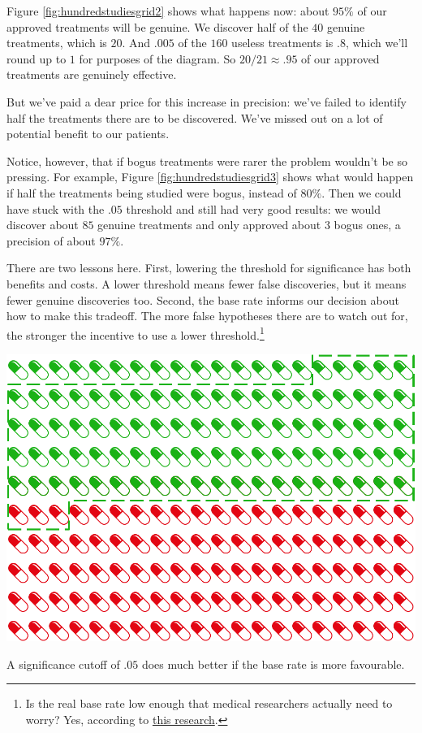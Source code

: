 \documentclass[justified]{tufte-book}
\theoremstyle{definition}
\theoremstyle{definition}
\theoremstyle{definition}
\theoremstyle{remark}
\begin{document}
Figure \ref{fig:hundredstudiesgrid2} shows what happens now: about \(95\%\) of our approved treatments will be genuine. We discover half of the \(40\) genuine treatments, which is \(20\). And \(.005\) of the \(160\) useless treatments is \(.8\), which we'll round up to \(1\) for purposes of the diagram. So \(20/21 \approx .95\) of our approved treatments are genuinely effective.

But we've paid a dear price for this increase in precision: we've failed to identify half the treatments there are to be discovered. We've missed out on a lot of potential benefit to our patients.

Notice, however, that if bogus treatments were rarer the problem wouldn't be so pressing. For example, Figure \ref{fig:hundredstudiesgrid3} shows what would happen if half the treatments being studied were bogus, instead of \(80\%\). Then we could have stuck with the \(.05\) threshold and still had very good results: we would discover about \(85\) genuine treatments and only approved about \(3\) bogus ones, a precision of about \(97\%\).

There are two lessons here. First, lowering the threshold for significance has both benefits and costs. A lower threshold means fewer false discoveries, but it means fewer genuine discoveries too. Second, the base rate informs our decision about how to make this tradeoff. The more false hypotheses there are to watch out for, the stronger the incentive to use a lower threshold.\footnote{Is the real base rate low enough that medical researchers actually need to worry? Yes, according to \href{https://www.doi.org/10.1038/nrd3439-c1}{this research}.}

\begin{marginfigure}
\includegraphics{_main_files/figure-latex/hundredstudiesgrid3-1} \caption[A significance cutoff of $.05$ does much better if the base rate is more favourable]{A significance cutoff of $.05$ does much better if the base rate is more favourable.}\label{fig:hundredstudiesgrid3}
\end{marginfigure}
\end{document}
